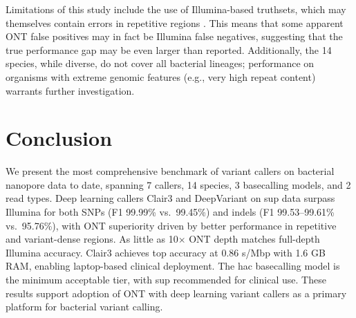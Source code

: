 \documentclass[11pt]{article}
\begin{document}
Limitations of this study include the use of Illumina-based truthsets, which may themselves contain errors in repetitive regions \citep{bush2020}. This means that some apparent ONT false positives may in fact be Illumina false negatives, suggesting that the true performance gap may be even larger than reported. Additionally, the 14 species, while diverse, do not cover all bacterial lineages; performance on organisms with extreme genomic features (e.g., very high repeat content) warrants further investigation.

\section{Conclusion}

We present the most comprehensive benchmark of variant callers on bacterial nanopore data to date, spanning 7 callers, 14 species, 3 basecalling models, and 2 read types. Deep learning callers Clair3 and DeepVariant on sup data surpass Illumina for both SNPs (F1 99.99\% vs.\ 99.45\%) and indels (F1 99.53--99.61\% vs.\ 95.76\%), with ONT superiority driven by better performance in repetitive and variant-dense regions. As little as 10$\times$ ONT depth matches full-depth Illumina accuracy. Clair3 achieves top accuracy at 0.86 s/Mbp with 1.6 GB RAM, enabling laptop-based clinical deployment. The hac basecalling model is the minimum acceptable tier, with sup recommended for clinical use. These results support adoption of ONT with deep learning variant callers as a primary platform for bacterial variant calling.



\end{document}
